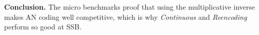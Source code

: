 \textbf{Conclusion.} The micro benchmarks proof that using the multiplicative inverse makes AN coding well competitive, which is why \emph{Continuous} and \emph{Reencoding} perform so good at SSB. %

